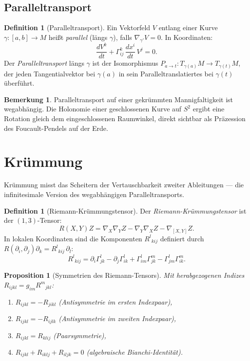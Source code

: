 \documentclass[12pt,a4paper]{amsart}
\newtheorem{proposition}[theorem]{Proposition}
\theoremstyle{definition}
\newtheorem{definition}[theorem]{Definition}
\newtheorem{bemerkung}[theorem]{Bemerkung}
\begin{document}
\subsection{Paralleltransport}

\begin{definition}[Paralleltransport]
Ein Vektorfeld $V$ entlang einer Kurve $\gamma: [a,b] \to M$ heißt
\emph{parallel} (längs $\gamma$), falls $\nabla_{\gamma'}V = 0$. In Koordinaten:
\[
  \frac{dV^k}{dt} + \Gamma^k_{ij}\,\frac{dx^i}{dt}\,V^j = 0.
\]
Der \emph{Paralleltransport} längs $\gamma$ ist der Isomorphismus
$P_{a \to t}: T_{\gamma(a)}M \to T_{\gamma(t)}M$, der jeden Tangentialvektor
bei $\gamma(a)$ in sein Paralleltranslatiertes bei $\gamma(t)$ überführt.
\end{definition}

\begin{bemerkung}
Paralleltransport auf einer gekrümmten Mannigfaltigkeit ist wegabhängig.
Die Holonomie einer geschlossenen Kurve auf $S^2$ ergibt eine Rotation gleich
dem eingeschlossenen Raumwinkel, direkt sichtbar als Präzession des
Foucault-Pendels auf der Erde.
\end{bemerkung}

\section{Krümmung}
\label{sec:kruemmung}

Krümmung misst das Scheitern der Vertauschbarkeit zweiter Ableitungen ---
die infinitesimale Version des wegabhängigen Paralleltransports.

\begin{definition}[Riemann-Krümmungstensor]
Der \emph{Riemann-Krümmungstensor} ist der $(1,3)$-Tensor:
\[
  R(X,Y)Z = \nabla_X \nabla_Y Z - \nabla_Y \nabla_X Z - \nabla_{[X,Y]} Z.
\]
In lokalen Koordinaten sind die Komponenten $R^l{}_{\!kij}$ definiert durch
$R(\partial_i, \partial_j)\partial_k = R^l{}_{\!kij}\,\partial_l$:
\[
  R^l{}_{\!kij} = \partial_i \Gamma^l_{jk} - \partial_j \Gamma^l_{ik}
  + \Gamma^l_{im}\Gamma^m_{jk} - \Gamma^l_{jm}\Gamma^m_{ik}.
\]
\end{definition}

\begin{proposition}[Symmetrien des Riemann-Tensors]
Mit herabgezogenen Indizes $R_{ijkl} = g_{im}R^m{}_{\!jkl}$:
\begin{enumerate}[label=(\roman*)]
  \item $R_{ijkl} = -R_{jikl}$ (Antisymmetrie im ersten Indexpaar),
  \item $R_{ijkl} = -R_{ijlk}$ (Antisymmetrie im zweiten Indexpaar),
  \item $R_{ijkl} = R_{klij}$ (Paarsymmetrie),
  \item $R_{ijkl} + R_{iklj} + R_{iljk} = 0$ (algebraische Bianchi-Identität).
\end{enumerate}
\end{proposition}
\end{document}
